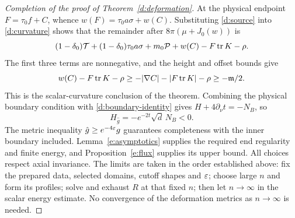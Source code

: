 \begin{proof}[Completion of the proof of Theorem~\ref{d:deformation}]
At the physical endpoint $F=\tau_0f+C$, whence
$w(F)=\tau_0a\sigma+w(C)$.  Substituting \eqref{d:source} into
\eqref{d:curvature} shows that the remainder after
$8\pi(\mu+J_0(w))$ is
\[
 (1-\delta_0)\mathcal T+
 (1-\delta_0)\tau_0a\sigma+m_0\mathcal P
                     +w(C)-F\operatorname{tr} K-\rho.
\]
The first three terms are nonnegative, and the height and offset
bounds give
\[
 w(C)-F\operatorname{tr} K-\rho
 \ge-|\nabla C|-|F\operatorname{tr} K|-\rho\ge-\mathfrak m/2.
\]
This is the scalar-curvature conclusion of the theorem.
Combining the physical boundary condition with
\eqref{d:boundary-identity} gives
$H+4\partial_\nu t=-N_B$, so
\[
 H_{\hat g}=-e^{-2t}\sqrt d\,N_B<0.
\]
The metric inequality $\hat g\ge e^{-4\varepsilon}g$ guarantees
completeness with the inner boundary included.
Lemma~\ref{e:asymptotics} supplies the required end regularity and
finite energy, and Proposition~\ref{e:flux} supplies its upper bound.
All choices respect axial invariance.  The limits are taken in the
order established above: fix the prepared data, selected domains,
cutoff shapes and $\varepsilon$; choose large $n$ and form its profiles;
solve and exhaust $R$ at that fixed $n$; then let $n\to\infty$ in
the scalar energy estimate.
No convergence of the deformation metrics as $n\to\infty$ is needed.
\end{proof}

